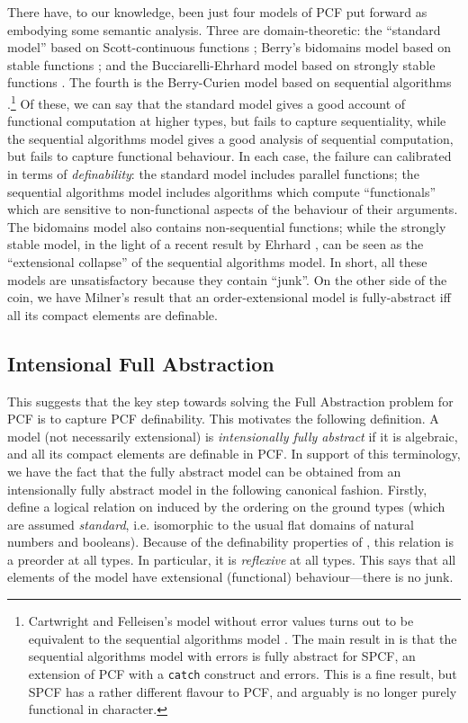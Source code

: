 \documentclass[11pt]{article}
\begin{document}
There have, to our knowledge, been just four models of PCF put forward
as embodying some semantic analysis. Three are domain-theoretic:
the ``standard model'' based on Scott-continuous functions \cite{PlotkinGD:lcfcpl};
Berry's bidomains model based on stable functions \cite{BerryG:modcom};
and the Bucciarelli-Ehrhard model based on strongly stable functions \cite{EhrhardT:extemb}.
The fourth is the Berry-Curien model based on sequential algorithms
\cite{BerryG:seqacd}.\footnote{Cartwright and Felleisen's model without error
values turns out to be equivalent to the sequential algorithms model
\cite{FelleisenM:obsseq,CurienPL:obssac}.
The main result in \cite{FelleisenM:obsseq,CurienPL:obssac} is that
the sequential algorithms model with errors is fully abstract for
SPCF, an extension of PCF with a {\tt catch} construct and errors. This
is a fine result, but SPCF has a rather different flavour to PCF, and
arguably is no longer purely functional in character.}
Of these, we can say that the standard model gives a good account
of functional computation at higher types, but fails to capture
sequentiality, while the sequential algorithms model gives a good
analysis of sequential computation, but fails to capture functional
behaviour. In each case, the failure can calibrated in terms of
{\em definability}: the standard model includes parallel functions;
the sequential algorithms model includes algorithms which compute
``functionals'' which are sensitive to non-functional aspects of the
behaviour of their arguments. The bidomains model also contains
non-sequential functions; while the strongly stable model, in the
light of a recent result by Ehrhard \cite{EhrhardT:prosas}, can be seen as the
``extensional collapse'' of the sequential algorithms model.
In short, all these models are unsatisfactory because they contain ``junk''.
On the other side of the coin, we have Milner's result that an
order-extensional
model is fully-abstract iff all its compact elements are definable.

\subsection*{Intensional Full Abstraction}
This suggests that the key step towards solving the Full Abstraction problem
for PCF is to capture PCF definability.
This motivates the following definition. A model 
(not necessarily extensional) is {\em intensionally fully abstract}
if it is algebraic, and all its compact elements are definable in PCF.
In support of this terminology, we have the fact that the fully abstract
model can be obtained from an intensionally fully abstract model 
in the following canonical fashion. Firstly, define a logical relation
on  induced by the ordering on the ground types
(which are assumed {\em standard}, i.e. isomorphic to the usual
flat domains of natural numbers and booleans). Because of the
definability properties of , this relation is a preorder at
all types.
In particular, it is {\em reflexive} at all types. This says that
all elements of the model have extensional (functional) behaviour---there
is no junk.
\end{document}
